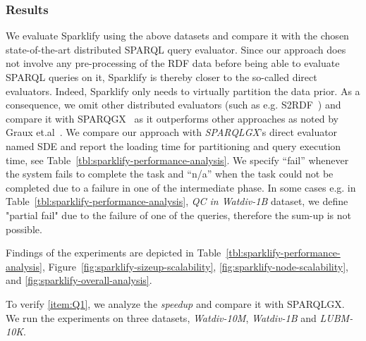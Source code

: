 \subsubsection{Results}
We evaluate Sparklify using the above datasets and compare it with the chosen state-of-the-art distributed \gls{SPARQL} query evaluator.
Since our approach does not involve any pre-processing of the RDF data before being able to evaluate \gls{SPARQL} queries on it, Sparklify is thereby closer to the so-called direct evaluators.
Indeed, Sparklify only needs to virtually partition the data prior.
As a consequence, we omit other distributed evaluators (such as e.g. S2RDF~\cite{Schatzle:2016:SRQ:2977797.2977806}) and compare it with SPARQGX~\cite{sparqlgx-iswc-2016} as it outperforms other approaches as noted by Graux et.al~\cite{sparqlgx-iswc-2016}.
We compare our approach with \emph{SPARQLGX}'s direct evaluator named SDE and report the loading time for partitioning and query execution time, see Table~\ref{tbl:sparklify-performance-analysis}.
We specify ``fail'' whenever the system fails to complete the task and ``n/a'' when the task could not be completed due to a failure in one of the intermediate phase.
In some cases e.g. in Table~\ref{tbl:sparklify-performance-analysis}, \textit{QC in Watdiv-1B} dataset, we define "partial fail" due to the failure of one of the queries, therefore the sum-up is not possible.

Findings of the experiments are depicted in Table~\ref{tbl:sparklify-performance-analysis}, Figure~\ref{fig:sparklify-sizeup-scalability}, \ref{fig:sparklify-node-scalability}, and  \ref{fig:sparklify-overall-analysis}.

To verify \ref{item:Q1}, we analyze the \textit{speedup} and compare it with SPARQLGX.
We run the experiments on three datasets, \emph{Watdiv-10M}, \emph{Watdiv-1B} and \emph{LUBM-10K}.

